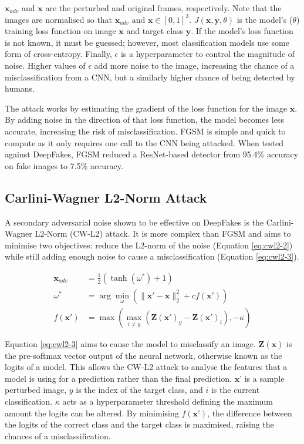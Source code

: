 $\mathbf{x}_{adv}$ and $\mathbf{x}$ are the perturbed and original frames, respectively. Note that the images are normalised so that $\mathbf{x}_{adv}\text{ and }\mathbf{x}\in[0,1]^3$. $J(\mathbf{x},\mathbf{y}, \theta)$ is the model's ($\theta$) training loss function on image $\textbf{x}$ and target class $\textbf{y}$. If the model's loss function is not known, it must be guessed; however, most classification models use some form of cross-entropy. Finally, $\epsilon$ is a hyperparameter to control the magnitude of noise. Higher values of $\epsilon$ add more noise to the image, increasing the chance of a misclassification from a CNN, but a similarly higher chance of being detected by humans.

The attack works by estimating the gradient of the loss function for the image $\textbf{x}$. By adding noise in the direction of that loss function, the model becomes less accurate, increasing the risk of misclassification. FGSM is simple and quick to compute as it only requires one call to the CNN being attacked. When tested against DeepFakes, FGSM reduced a ResNet-based detector from 95.4\% accuracy on fake images to 7.5\% accuracy\cite{gandhi2020adversarial}.

\subsection{Carlini-Wagner L2-Norm Attack}

A secondary adversarial noise shown to be effective on DeepFakes is the Carlini-Wagner L2-Norm (CW-L2) attack\cite{carlini2017towards}. It is more complex than FGSM and aims to minimise two objectives: reduce the L2-norm of the noise (Equation \ref{eq:cwl2-2}) while still adding enough noise to cause a misclassification (Equation \ref{eq:cwl2-3}).

\begin{align}
    \mathbf{x}_{adv} &= \frac{1}{2} \left( \tanh(\omega^*) + 1 \right) \label{eq:cwl2-1}\\
    \omega^* &= \arg\min_\omega \left( \|\mathbf{x'} - \mathbf{x}\|_2^2 + c f(\mathbf{x'}) \right) \label{eq:cwl2-2}\\
    f(\mathbf{x'}) &= \max\left( \max_{i \neq y} \left( \mathbf{Z}(\mathbf{x'})_y - \mathbf{Z}(\mathbf{x'})_i \right), -\kappa \right) \label{eq:cwl2-3}
\end{align}

Equation \ref{eq:cwl2-3} aims to cause the model to misclassify an image. $\mathbf{Z}(\textbf{x})$ is the pre-softmax vector output of the neural network, otherwise known as the logits of a model. This allows the CW-L2 attack to analyse the features that a model is using for a prediction rather than the final prediction. $\textbf{x'}$ is a sample perturbed image, $y$ is the index of the target class, and $i$ is the current classification. $\kappa$ acts as a hyperparameter threshold defining the maximum amount the logits can be altered. By minimising $f(\textbf{x'})$, the difference between the logits of the correct class and the target class is maximised, raising the chances of a misclassification.

